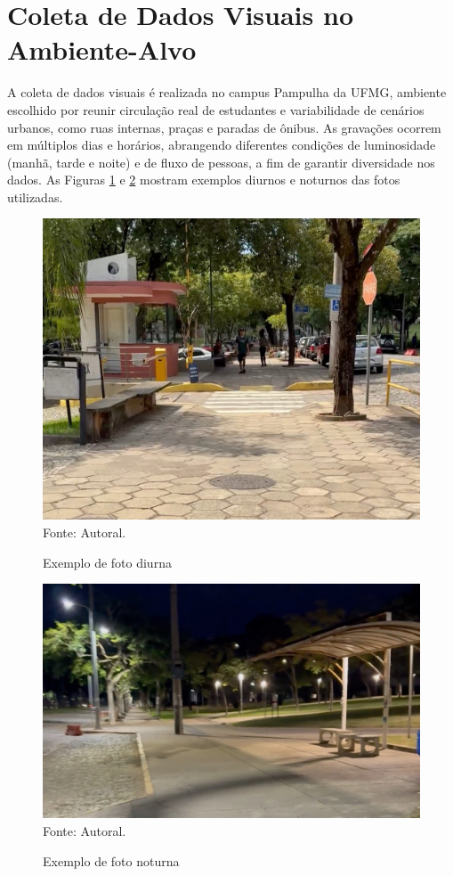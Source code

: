 \section{\textbf{Coleta de Dados Visuais no Ambiente-Alvo}}

A coleta de dados visuais é realizada no campus Pampulha da UFMG, ambiente escolhido por reunir circulação real de estudantes e variabilidade de cenários urbanos, como ruas internas, praças e paradas de ônibus. As gravações ocorrem em múltiplos dias e horários, abrangendo diferentes condições de luminosidade (manhã, tarde e noite) e de fluxo de pessoas, a fim de garantir diversidade nos dados. As Figuras \ref{fg-exe_grav_dia} e \ref{fg-exe_grav_noite} mostram exemplos diurnos e noturnos das fotos utilizadas.

\begin{figure}[htbp]
  \centering
  \caption{Exemplo de foto diurna}
  \includegraphics[width=0.8 \textwidth]{Figuras/exe_grav_dia - Editado.jpg}
  \\
  Fonte: Autoral.
  \label{fg-exe_grav_dia}
\end{figure}

\begin{figure}[htbp]
  \centering
  \caption{Exemplo de foto noturna}
  \includegraphics[width=0.8 \textwidth]{Figuras/exe_grav_noite - Editado.jpg}
  \\
  Fonte: Autoral.
  \label{fg-exe_grav_noite}
\end{figure}

